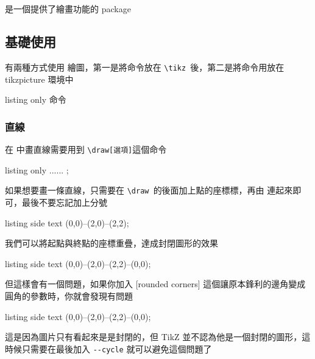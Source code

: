 \chapter{\TikZ}

\TikZ 是一個提供了繪畫功能的 package

\section{基礎使用}

有兩種方式使用 \TikZ 繪圖，第一是將命令放在 \verb`\tikz `後，第二是將命令用放在 tikzpicture 環境中

\begin{tcblisting}{listing only}
\tikz 命令
\end{tcblisting}

\subsection{直線}

在 \TikZ 中畫直線需要用到 \verb`\draw[選項]`這個命令

\begin{tcblisting}{listing only}
\draw[選項] ...... ;
\end{tcblisting}

如果想要畫一條直線，只需要在 \verb`\draw `的後面加上點的座標標，再由\-\- 連起來即可，最後不要忘記加上分號

\begin{tcblisting}{listing side text}
\tikz \draw (0,0)--(2,0)--(2,2);
\end{tcblisting}

我們可以將起點與終點的座標重疊，達成封閉圖形的效果

\begin{tcblisting}{listing side text}
\tikz \draw (0,0)--(2,0)--(2,2)--(0,0);
\end{tcblisting}

但這樣會有一個問題，如果你加入 [rounded corners] 這個讓原本鋒利的邊角變成圓角的參數時，你就會發現有問題

\begin{tcblisting}{listing side text}
\tikz {} (0,0)--(2,0)--(2,2)--(0,0);
\end{tcblisting}

這是因為圖片只有看起來是是封閉的，但 TikZ 並不認為他是一個封閉的圖形，這時候只需要在最後加入 \verb`--cycle` 就可以避免這個問題了

